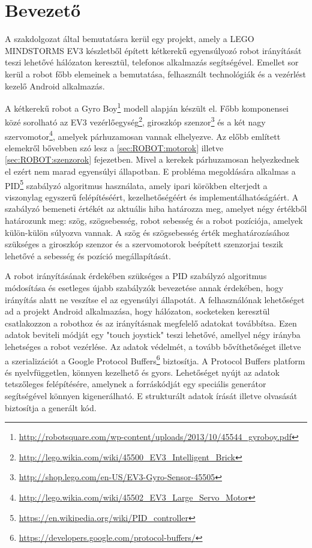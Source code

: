 \chapter{Bevezető}
A szakdolgozat által bemutatásra kerül egy projekt, amely a LEGO MINDSTORMS EV3\cite{mindstormsEv3} készletből épített kétkerekű egyensúlyozó robot irányítását teszi lehetővé hálózaton keresztül, telefonos alkalmazás segítségével. Emellet sor kerül a robot főbb elemeinek a bemutatása, felhasznált technológiák és a vezérlést kezelő Android alkalmazás.

A kétkerekű robot a Gyro Boy\footnote{\href{http://robotsquare.com/wp-content/uploads/2013/10/45544\_gyroboy.pdf}{http://robotsquare.com/wp-content/uploads/2013/10/45544\_gyroboy.pdf}} modell alapján készült el. Főbb komponensei közé sorolható az EV3 vezérlőegység\footnote{\href{http://lego.wikia.com/wiki/45500\_EV3\_Intelligent\_Brick}{http://lego.wikia.com/wiki/45500\_EV3\_Intelligent\_Brick}}, giroszkóp szenzor\footnote{\href{http://shop.lego.com/en-US/EV3-Gyro-Sensor-45505}{http://shop.lego.com/en-US/EV3-Gyro-Sensor-45505}} és a két nagy szervomotor\footnote{\href{http://lego.wikia.com/wiki/45502\_EV3\_Large\_Servo\_Motor}{http://lego.wikia.com/wiki/45502\_EV3\_Large\_Servo\_Motor}}, amelyek párhuzamosan vannak elhelyezve. Az előbb említett elemekről bővebben szó lesz a \ref{sec:ROBOT:motorok} illetve \ref{sec:ROBOT:szenzorok} fejezetben. Mivel a kerekek párhuzamosan helyezkednek el ezért nem marad egyensúlyi állapotban. E probléma megoldására alkalmas a PID\footnote{\href{https://en.wikipedia.org/wiki/PID\_controller}{https://en.wikipedia.org/wiki/PID\_controller}} szabályzó algoritmus használata, amely ipari körökben elterjedt a viszonylag egyszerű felépítéséért, kezelhetőségéért és implementálhatóságáért. A szabályzó bemeneti értékét az aktuális hiba határozza meg, amelyet négy értékből határozunk meg: szög, szögsebesség, robot sebesség és a robot pozíciója, amelyek külön-külön súlyozva vannak. A szög és szögsebesség érték meghatározásához szükséges a giroszkóp szenzor és a szervomotorok beépített szenzorjai teszik lehetővé a sebesség és pozíció megállapítását.

A robot irányításának érdekében szükséges a PID szabályzó algoritmus módosítása és esetleges újabb szabályzók bevezetése annak érdekében, hogy irányítás alatt ne veszítse el az egyensúlyi állapotát. A felhasználónak lehetőséget ad a projekt Android alkalmazása, hogy hálózaton, socketeken keresztül csatlakozzon a robothoz és az irányításnak megfelelő adatokat továbbítsa. Ezen adatok beviteli módját egy "touch joystick" teszi lehetővé, amellyel négy irányba lehetséges a robot vezérlése. Az adatok védelmét, a tovább bővíthetőséget illetve a szerializációt a Google Protocol Buffers\footnote{\href {https://developers.google.com/protocol-buffers/}{https://developers.google.com/protocol-buffers/}} biztosítja. A Protocol Buffers platform és nyelvfüggetlen, könnyen kezelhető és gyors. Lehetőséget nyújt az adatok tetszőleges felépítésére, amelynek a forráskódját egy speciális generátor segítségével könnyen kigenerálható. E strukturált adatok írását illetve olvasását biztosítja a generált kód.

